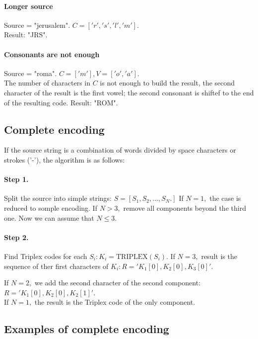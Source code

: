 \documentclass[12pt,a4paper]{article}
\begin{document}
	\paragraph{Longer source\\}
	Source = "jerusalem". $C= \left['r', 's', 'l', 'm'\right]. $ \\
	Result: "JRS".
	
	\paragraph{Consonants are not enough\\}
	Source = "roma". $C= \left['m'\right], V = \left[ 'o', 'a' \right].$ \\
	The number of characters in $C$ is not enough to build the result, the second character of the result is the first vowel; the second consonant is shiftef to the end of the resulting code.
	Result: "ROM".
	
	\subsection{Complete encoding}
	If the source string is a combination of words divided by space characters or strokes ('-'), the algorithm is as follows:
	\paragraph{Step 1.} Split the source into simple strings: $S = \left[ S_1, S_2, ... , S_N.\right]$
	If $N=1,$ the case is reduced to somple encoding. If $N > 3,$ remove all components beyond the third one. Now we can assume that $N \le 3.$
	
	\paragraph{Step 2.} Find Triplex codes for each $S_i: K_i = \mathrm{TRIPLEX}(S_i).$ If $N=3, $ result is the sequence of ther first characters of $K_i: R='K_1[0], K_2[0], K_3[0]'.$
	
	If $N=2,$ we add the second character of the second component: $R='K_1[0], K_2[0], K_2[1]'.$ \\
	If $N=1,$ the result is the Triplex code of the only component. \\
	
	\subsection{Examples of complete encoding}
\end{document}
